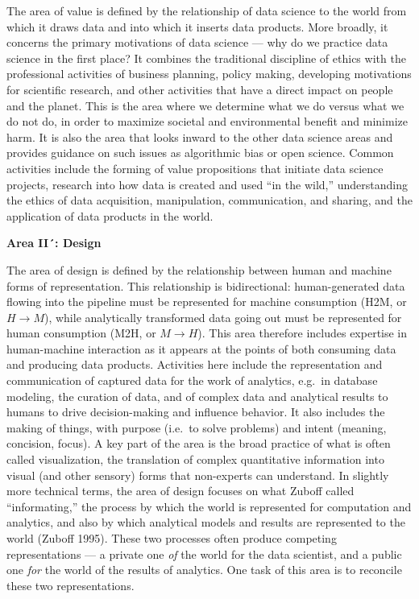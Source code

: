 \documentclass[
  letterpaper,
  DIV=11,
  numbers=noendperiod]{scrreprt}
\begin{document}
The area of value is defined by the relationship of data science to the
world from which it draws data and into which it inserts data products.
More broadly, it concerns the primary motivations of data science ---
why do we practice data science in the first place? It combines the
traditional discipline of ethics with the professional activities of
business planning, policy making, developing motivations for scientific
research, and other activities that have a direct impact on people and
the planet. This is the area where we determine what we do versus what
we do not do, in order to maximize societal and environmental benefit
and minimize harm. It is also the area that looks inward to the other
data science areas and provides guidance on such issues as algorithmic
bias or open science. Common activities include the forming of value
propositions that initiate data science projects, research into how data
is created and used ``in the wild,'' understanding the ethics of data
acquisition, manipulation, communication, and sharing, and the
application of data products in the world.

\textbf{Area II´: Design}

The area of design is defined by the relationship between human and
machine forms of representation. This relationship is bidirectional:
human-generated data flowing into the pipeline must be represented for
machine consumption (H2M, or \(H \rightarrow M\)), while analytically
transformed data going out must be represented for human consumption
(M2H, or \(M \rightarrow H\)). This area therefore includes expertise in
human-machine interaction as it appears at the points of both consuming
data and producing data products. Activities here include the
representation and communication of captured data for the work of
analytics, e.g.~in database modeling, the curation of data, and of
complex data and analytical results to humans to drive decision-making
and influence behavior. It also includes the making of things, with
purpose (i.e.~to solve problems) and intent (meaning, concision, focus).
A key part of the area is the broad practice of what is often called
visualization, the translation of complex quantitative information into
visual (and other sensory) forms that non-experts can understand. In
slightly more technical terms, the area of design focuses on what Zuboff
called ``informating,'' the process by which the world is represented
for computation and analytics, and also by which analytical models and
results are represented to the world (Zuboff 1995). These two processes
often produce competing representations --- a private one \emph{of} the
world for the data scientist, and a public one \emph{for} the world of
the results of analytics. One task of this area is to reconcile these
two representations.
\end{document}
